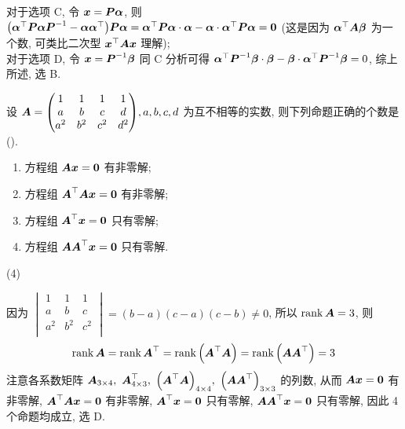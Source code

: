 \begin{solution}
    对于选项 C, 令 $\vb*{x}=\vb*{P\alpha}$, 则 $\qty(\vb*{\alpha}^\top\vb*{P}\vb*{\alpha P}^{-1}-\vb*{\alpha\alpha}^\top)\vb*{P\alpha}=\vb*{\alpha}^\top\vb*{P\alpha}\cdot\vb*{\alpha}-\vb*{\alpha}\cdot \vb*{\alpha}^\top\vb*{P\alpha}=\vb*{0}$ (这是因为 $\vb*{\alpha}^\top\vb*{A}\vb*{\beta}$ 为一个数, 可类比二次型 $\vb*{x}^\top\vb*{Ax}$ 理解);\\ 
    对于选项 D, 令 $\vb*{x}=\vb*{P}^{-1}\vb*{\beta}$ 同 C 分析可得 $\vb*{\alpha}^\top\vb*{P}^{-1}\vb*{\beta}\cdot\vb*{\beta}-\vb*{\beta}\cdot \vb*{\alpha}^\top\vb*{P}^{-1}\vb*{\beta}=0$, 综上所述, 选 B.
\end{solution}

\begin{example}
    设 $\vb*{A}=\mqty(1&1&1&1\\ a&b&c&d\\ a^2&b^2&c^2&d^2),a,b,c,d$ 为互不相等的实数, 则下列命题正确的个数是 (\quad).
    \begin{enumerate}[label=(\arabic{*})]
        \item 方程组 $\vb*{Ax}=\vb*{0}$ 有非零解;
        \item 方程组 $\vb*{A}^\top\vb*{Ax}=\vb*{0}$ 有非零解;
        \item 方程组 $\vb*{A}^\top \vb*{x}=\vb*{0}$ 只有零解;
        \item 方程组 $\vb*{AA}^\top\vb*{x}=\vb*{0}$ 只有零解.
    \end{enumerate}
    \begin{tasks}(4)
    \end{tasks}
\end{example}
\begin{solution}
    因为 $\begin{vmatrix} 1 & 1 & 1 \\ a & b & c \\ a^2 & b^2 & c^2 \\\end{vmatrix}=(b-a)(c-a)(c-b)\neq0$, 所以 $\rank\vb*{A}=3$, 则 $$
    \rank\vb*{A}=\rank\vb*{A}^\top=\rank\qty(\vb*{A}^\top\vb*{A})=\rank\qty(\vb*{AA}^\top)=3
    $$
    注意各系数矩阵 $\vb*{A}_{3\times 4},~\vb*{A}_{4\times 3}^\top, ~\qty(\vb*{A}^\top\vb*{A})_{4\times 4},~\qty(\vb*{AA}^\top)_{3\times 3}$ 的列数, 从而 $\vb*{Ax}=\vb*{0}$ 有非零解, $\vb*{A}^\top\vb*{Ax}=\vb*{0}$ 有非零解, $\vb*{A}^\top \vb*{x}=\vb*{0}$ 只有零解, $\vb*{AA}^\top\vb*{x}=\vb*{0}$ 只有零解, 因此 4 个命题均成立, 选 D.
\end{solution}

